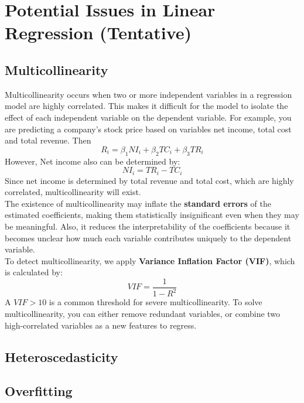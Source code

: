 \documentclass[11pt]{article}
\begin{document}
\section{Potential Issues in Linear Regression (Tentative)}


\subsection{Multicollinearity}
Multicollinearity occurs when two or more independent variables in a regression model are highly correlated. This makes it difficult for the model to isolate the effect 
of each independent variable on the dependent variable. For example, you are predicting a company’s stock price based on variables net income, total cost and total revenue. Then
\[R_i=\beta_1NI_i+\beta_2TC_i+\beta_3TR_i\]
However, Net income also can be determined by:
\[NI_i=TR_i-TC_i\]
Since net income is determined by total revenue and total cost, which are highly correlated, multicollinearity will exist. \\
The existence of multicollinearity may inflate the \textbf{standard errors} of the estimated coefficients, making them statistically insignificant even when they may be meaningful. Also, 
it reduces the interpretability of the coefficients because it becomes unclear how much each variable contributes uniquely to the dependent variable. \\
To detect multicollinearity, we apply \textbf{Variance Inflation Factor (VIF)}, which is calculated by:
\[
VIF = \frac{1}{1-R^2}
\]
A $VIF > 10$ is a common threshold for severe multicollinearity. To solve multicollinearity, you can either remove redundant variables, or combine two high-correlated variables as a new features
to regress.

\subsection{Heteroscedasticity}


\subsection{Overfitting}
\end{document}
